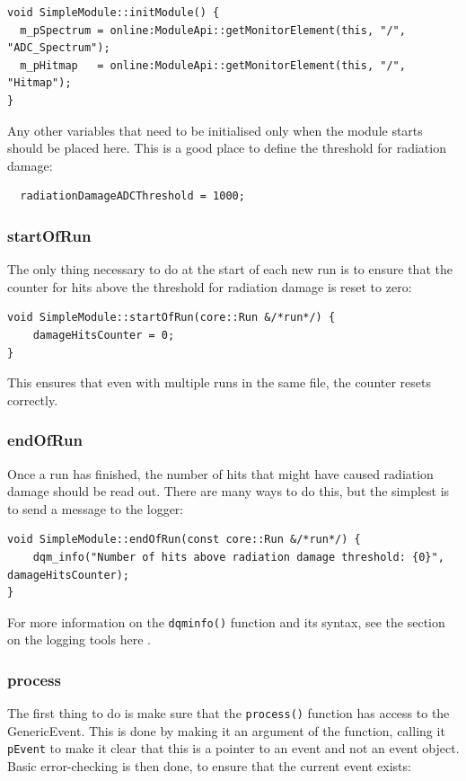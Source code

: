 \begin{lstlisting}
void SimpleModule::initModule() {
  m_pSpectrum = online:ModuleApi::getMonitorElement(this, "/", "ADC_Spectrum");
  m_pHitmap   = online:ModuleApi::getMonitorElement(this, "/", "Hitmap");
}
\end{lstlisting}

Any other variables that need to be initialised only when the module starts should be placed here. This is a good place to define the threshold for radiation damage:

\begin{lstlisting}
  radiationDamageADCThreshold = 1000;
\end{lstlisting}

\subsubsection{startOfRun}
The only thing necessary to do at the start of each new run is to ensure that the counter for hits above the threshold for radiation damage is reset to zero:

\begin{lstlisting}
void SimpleModule::startOfRun(core::Run &/*run*/) {
    damageHitsCounter = 0;
}
\end{lstlisting}

This ensures that even with multiple runs in the same file, the counter resets correctly.

\subsubsection{endOfRun}
Once a run has finished, the number of hits that might have caused radiation damage should be read out. There are many ways to do this, but the simplest is to send a message to the logger:

\begin{lstlisting}
void SimpleModule::endOfRun(const core::Run &/*run*/) {
    dqm_info("Number of hits above radiation damage threshold: {0}", damageHitsCounter);
}
\end{lstlisting}

For more information on the \texttt{dqm\textunderscore info()} function and its syntax, see the section on the logging tools here \cite{dqm4hep-user-manual-coretools}.

\subsubsection{process}
The first thing to do is make sure that the \texttt{process()} function has access to the GenericEvent. This is done by making it an argument of the function, calling it \texttt{pEvent} to make it clear that this is a pointer to an event and not an event object. Basic error-checking is then done, to ensure that the current event exists:


